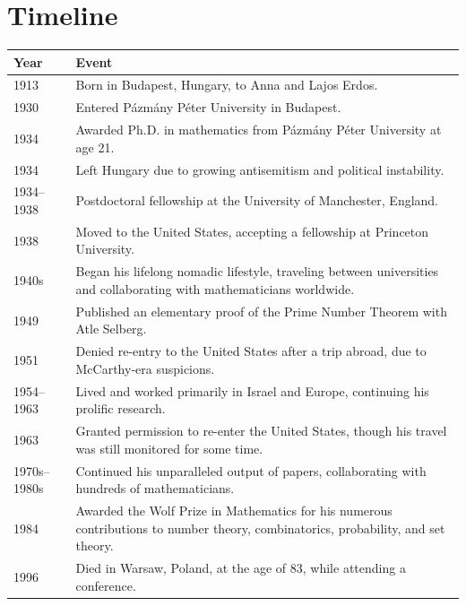 \section*{Timeline}
\begin{tabularx}{\linewidth}{|p{1.5cm}|>{\raggedright\arraybackslash}X|}
\hline
\textbf{Year} & \textbf{Event} \\ \hline
1913 & Born in Budapest, Hungary, to Anna and Lajos Erdos. \\ \hline
1930 & Entered Pázmány Péter University in Budapest. \\ \hline
1934 & Awarded Ph.D. in mathematics from Pázmány Péter University at age 21. \\ \hline
1934 & Left Hungary due to growing antisemitism and political instability. \\ \hline
1934--1938 & Postdoctoral fellowship at the University of Manchester, England. \\ \hline
1938 & Moved to the United States, accepting a fellowship at Princeton University. \\ \hline
1940s & Began his lifelong nomadic lifestyle, traveling between universities and collaborating with mathematicians worldwide. \\ \hline
1949 & Published an elementary proof of the Prime Number Theorem with Atle Selberg. \\ \hline
1951 & Denied re-entry to the United States after a trip abroad, due to McCarthy-era suspicions. \\ \hline
1954--1963 & Lived and worked primarily in Israel and Europe, continuing his prolific research. \\ \hline
1963 & Granted permission to re-enter the United States, though his travel was still monitored for some time. \\ \hline
1970s--1980s & Continued his unparalleled output of papers, collaborating with hundreds of mathematicians. \\ \hline
1984 & Awarded the Wolf Prize in Mathematics for his numerous contributions to number theory, combinatorics, probability, and set theory. \\ \hline
1996 & Died in Warsaw, Poland, at the age of 83, while attending a conference. \\ \hline
\end{tabularx}


